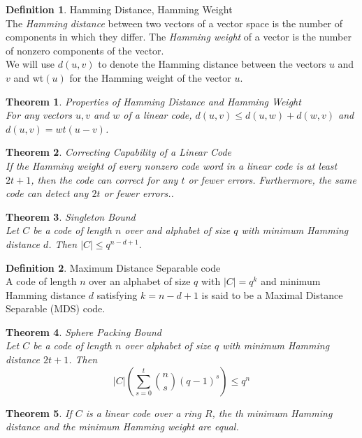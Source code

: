 \documentclass{article}
\newtheorem{theorem}{Theorem}
\theoremstyle{definition}
\newtheorem{definition}{Definition}
\begin{document}
\begin{definition}{Hamming Distance, Hamming Weight}\\The \textit{Hamming distance} between two vectors of a vector space is the number of components in which they differ. The \textit{Hamming weight} of a vector is the number of nonzero components of the vector.\\ We will use $d(u,v)$ to denote the Hamming distance between the vectors $u$ and $v$ and wt$(u)$ for the Hamming weight of the vector $u$.
\end{definition}

\begin{theorem}{Properties of Hamming Distance and Hamming Weight}\\
For any vectors $u,v$ and $w$ of a linear code, $d(u,v)\leq d(u,w)+d(w,v)$ and $d(u,v)=wt(u-v)$.
\end{theorem}

\begin{theorem}{Correcting Capability of a Linear Code}\\
If the Hamming weight of every nonzero code word in a linear code is at least $2t+1$, then the code can correct for any $t$ or fewer errors. Furthermore, the same code can detect any $2t$ or fewer errors..
\end{theorem}

\begin{theorem}{Singleton Bound}\\
  Let $C$ be a code of length $n$ over and alphabet of size $q$ with minimum Hamming distance $d$. Then $|C| \leq q^{n-d+1}.$
\end{theorem}

\begin{definition}{Maximum Distance Separable code}\\
  A code of length $n$ over an alphabet of size $q$ with $|C| = q^k$ and minimum Hamming distance $d$ satisfying $k=n-d+1$ is said to be a Maximal Distance Separable (MDS) code.
\end{definition}

\begin{theorem}{Sphere Packing Bound}\\
  Let $C$ be a code of length $n$ over alphabet of size $q$ with minimum Hamming distance $2t+1$. Then
  \[|C|\left(\sum_{s=0}^t {n \choose s}(q-1)^s\right)\leq q^n\]
\end{theorem}

\begin{theorem}
  If $C$ is a linear code over a ring $R$, the th minimum Hamming distance and the minimum Hamming weight are equal.
\end{theorem}
\end{document}
